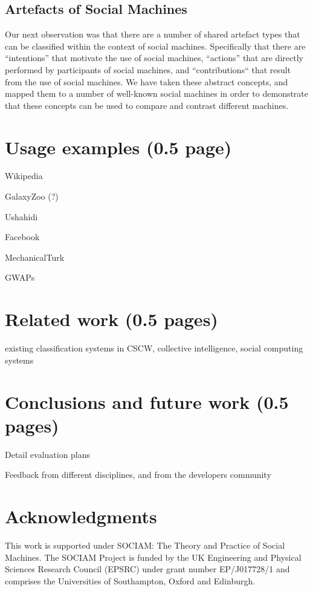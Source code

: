 \documentclass{sig-alternate}
\begin{document}
\subsection{Artefacts of Social Machines}

Our next observation was that there are a number of shared artefact types that can be classified within the context of social machines. Specifically that
there are ``intentions'' that motivate the use of social machines, ``actions'' that are directly performed by participants of social machines, and ``contributions``
that result from the use of social machines. We have taken these abstract concepts, and mapped them to a number of well-known social machines in order
to demonstrate that these concepts can be used to compare and contrast different machines.





\section{Usage examples (0.5 page)}
Wikipedia

GalaxyZoo (?)

Ushahidi

Facebook

MechanicalTurk

GWAPs


\section{Related work (0.5 pages)}

existing classification systems in CSCW, collective intelligence, social computing systems

\section{Conclusions and future work (0.5 pages)}

Detail evaluation plans

Feedback from different disciplines, and from the developers community

\section{Acknowledgments}

This work is supported under SOCIAM: The Theory and Practice of Social Machines.  The SOCIAM Project is funded by the UK Engineering and Physical Sciences Research Council (EPSRC) under grant number EP/J017728/1 and comprises the Universities of Southampton, Oxford and Edinburgh.

%

%
%


\balancecolumns %
\end{document}
